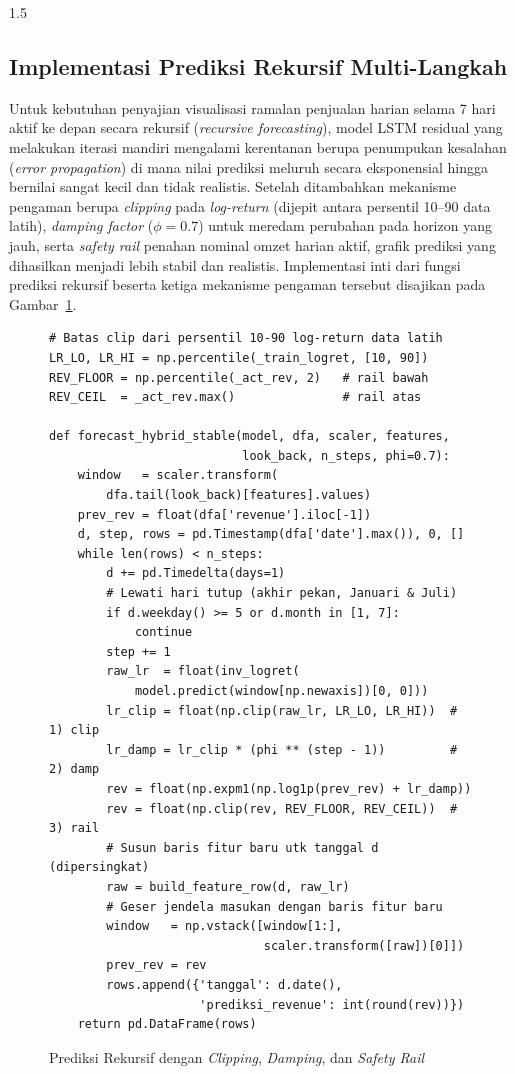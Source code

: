 \documentclass[12pt, a4paper, onecolumn, oneside]{report}
\begin{document}
\begin{spacing}{1.5}
\subsection{Implementasi Prediksi Rekursif Multi-Langkah}

Untuk kebutuhan penyajian visualisasi ramalan penjualan harian selama 7 hari aktif ke depan secara rekursif (\textit{recursive forecasting}), model LSTM residual yang melakukan iterasi mandiri mengalami kerentanan berupa penumpukan kesalahan (\textit{error propagation}) di mana nilai prediksi meluruh secara eksponensial hingga bernilai sangat kecil dan tidak realistis. Setelah ditambahkan mekanisme pengaman berupa \textit{clipping} pada \textit{log-return} (dijepit antara persentil 10--90 data latih), \textit{damping factor} ($\phi = 0.7$) untuk meredam perubahan pada horizon yang jauh, serta \textit{safety rail} penahan nominal omzet harian aktif, grafik prediksi yang dihasilkan menjadi lebih stabil dan realistis. Implementasi inti dari fungsi prediksi rekursif beserta ketiga mekanisme pengaman tersebut disajikan pada Gambar~\ref{fig:recursive}.

\begin{figure}[H]
\begin{lstlisting}
# Batas clip dari persentil 10-90 log-return data latih
LR_LO, LR_HI = np.percentile(_train_logret, [10, 90])
REV_FLOOR = np.percentile(_act_rev, 2)   # rail bawah
REV_CEIL  = _act_rev.max()               # rail atas

def forecast_hybrid_stable(model, dfa, scaler, features,
                           look_back, n_steps, phi=0.7):
    window   = scaler.transform(
        dfa.tail(look_back)[features].values)
    prev_rev = float(dfa['revenue'].iloc[-1])
    d, step, rows = pd.Timestamp(dfa['date'].max()), 0, []
    while len(rows) < n_steps:
        d += pd.Timedelta(days=1)
        # Lewati hari tutup (akhir pekan, Januari & Juli)
        if d.weekday() >= 5 or d.month in [1, 7]:
            continue
        step += 1
        raw_lr  = float(inv_logret(
            model.predict(window[np.newaxis])[0, 0]))
        lr_clip = float(np.clip(raw_lr, LR_LO, LR_HI))  # 1) clip
        lr_damp = lr_clip * (phi ** (step - 1))         # 2) damp
        rev = float(np.expm1(np.log1p(prev_rev) + lr_damp))
        rev = float(np.clip(rev, REV_FLOOR, REV_CEIL))  # 3) rail
        # Susun baris fitur baru utk tanggal d (dipersingkat)
        raw = build_feature_row(d, raw_lr)
        # Geser jendela masukan dengan baris fitur baru
        window   = np.vstack([window[1:],
                              scaler.transform([raw])[0]])
        prev_rev = rev
        rows.append({'tanggal': d.date(),
                     'prediksi_revenue': int(round(rev))})
    return pd.DataFrame(rows)
\end{lstlisting}
\caption{Prediksi Rekursif dengan \textit{Clipping}, \textit{Damping}, dan \textit{Safety Rail}}
\label{fig:recursive}
\end{figure}


\end{spacing}
\end{document}
